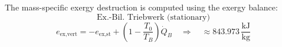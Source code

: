 The mass-specific exergy destruction is computed using the exergy balance:  
\[
\text{Ex.-Bil. Triebwerk (stationary)}  
\]  
\[
e_{\text{ex,vert}} = -e_{\text{ex,st}} + \left( 1 - \frac{T_0}{T_B} \right) \dot{Q}_B \quad \Rightarrow \quad \approx 843.973 \, \frac{\text{kJ}}{\text{kg}}
\]